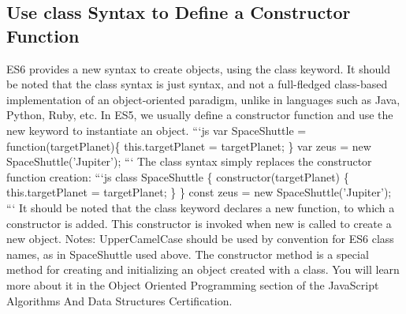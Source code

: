 \documentclass{article}%
\begin{document}
%
\subsection{Use class Syntax to Define a Constructor Function}%
\label{subsec:UseclassSyntaxtoDefineaConstructorFunction}%
ES6 provides a new syntax to create objects, using the class keyword.\newline%
It should be noted that the class syntax is just syntax, and not a full{-}fledged class{-}based implementation of an object{-}oriented paradigm, unlike in languages such as Java, Python, Ruby, etc.\newline%
In ES5, we usually define a constructor function and use the new keyword to instantiate an object.\newline%
```js\newline%
var SpaceShuttle = function(targetPlanet)\{\newline%
  this.targetPlanet = targetPlanet;\newline%
\}\newline%
var zeus = new SpaceShuttle('Jupiter');\newline%
```\newline%
The class syntax simply replaces the constructor function creation:\newline%
```js\newline%
class SpaceShuttle \{\newline%
  constructor(targetPlanet) \{\newline%
    this.targetPlanet = targetPlanet;\newline%
  \}\newline%
\}\newline%
const zeus = new SpaceShuttle('Jupiter');\newline%
```\newline%
It should be noted that the class keyword declares a new function, to which a constructor is added. This constructor is invoked when new is called to create a new object.\newline%
Notes:\newline%
 UpperCamelCase should be used by convention for ES6 class names, as in SpaceShuttle used above.\newline%
 The constructor method is a special method for creating and initializing an object created with a class. You will learn more about it in the Object Oriented Programming section of the JavaScript Algorithms And Data Structures Certification.\newline%
\end{document}
